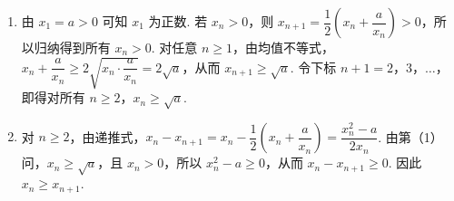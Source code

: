 \begin{solution}
\begin{enumerate}
\item 由 \(x_1=a>0\) 可知 \(x_1\) 为正数. 若 \(x_n>0\)，则 \(x_{n+1}=\dfrac{1}{2}\left(x_n+\dfrac{a}{x_n}\right)>0\)，所以归纳得到所有 \(x_n>0\). 对任意 \(n\geqslant1\)，由均值不等式，\(x_n+\dfrac{a}{x_n}\geqslant2\sqrt{x_n\cdot\dfrac{a}{x_n}}=2\sqrt a\)，从而 \(x_{n+1}\geqslant\sqrt a\). 令下标 \(n+1=2\)，\(3\)，\(\ldots\)，即得对所有 \(n\geqslant2\)，\(x_n\geqslant\sqrt a\).
\item 对 \(n\geqslant2\)，由递推式，\(x_n-x_{n+1}=x_n-\dfrac{1}{2}\left(x_n+\dfrac{a}{x_n}\right)=\dfrac{x_n^2-a}{2x_n}\). 由第（1）问，\(x_n\geqslant\sqrt a\)，且 \(x_n>0\)，所以 \(x_n^2-a\geqslant0\)，从而 \(x_n-x_{n+1}\geqslant0\). 因此 \(x_n\geqslant x_{n+1}\).
\end{enumerate}
\end{solution}

